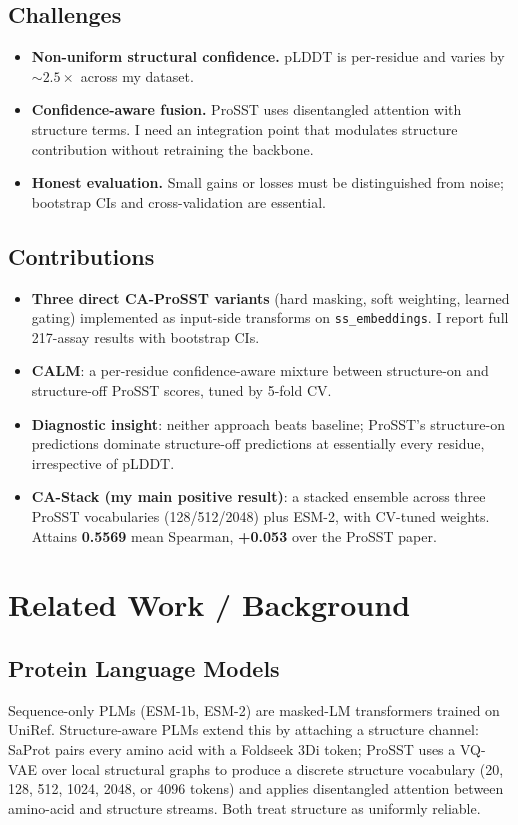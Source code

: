 \documentclass[11pt,a4paper]{article}
\begin{document}
\subsection{Challenges}
\begin{itemize}[leftmargin=*]
    \item \textbf{Non-uniform structural confidence.} pLDDT is
    per-residue and varies by $\sim\!2.5\times$ across my dataset.
    \item \textbf{Confidence-aware fusion.} ProSST uses disentangled
    attention with structure terms. I need an integration point that
    modulates structure contribution without retraining the backbone.
    \item \textbf{Honest evaluation.} Small gains or losses must be
    distinguished from noise; bootstrap CIs and cross-validation are
    essential.
\end{itemize}

\subsection{Contributions}
\begin{itemize}[leftmargin=*]
    \item \textbf{Three direct CA-ProSST variants} (hard masking, soft
    weighting, learned gating) implemented as input-side transforms
    on \texttt{ss\_embeddings}. I report full 217-assay results with
    bootstrap CIs.
    \item \textbf{CALM}: a per-residue confidence-aware mixture between
    structure-on and structure-off ProSST scores, tuned by 5-fold CV.
    \item \textbf{Diagnostic insight}: neither approach beats baseline;
    ProSST's structure-on predictions dominate structure-off predictions
    at essentially every residue, irrespective of pLDDT.
    \item \textbf{CA-Stack (my main positive result)}: a stacked
    ensemble across three ProSST vocabularies (128/512/2048) plus ESM-2,
    with CV-tuned weights. Attains \textbf{0.5569} mean Spearman,
    \textbf{+0.053} over the ProSST paper.
\end{itemize}

\section{Related Work / Background}

\subsection{Protein Language Models}
Sequence-only PLMs (ESM-1b, ESM-2) are masked-LM transformers trained
on UniRef. Structure-aware PLMs extend this by attaching a structure
channel: SaProt pairs every amino acid with a Foldseek 3Di token;
ProSST uses a VQ-VAE over local structural graphs to produce a discrete
structure vocabulary (20, 128, 512, 1024, 2048, or 4096 tokens) and
applies disentangled attention between amino-acid and structure streams.
Both treat structure as uniformly reliable.
\end{document}
